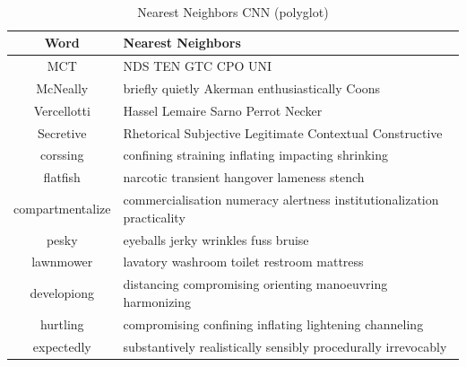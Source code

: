         \begin{table}[!ht]
          \begin{center}
            \caption{Nearest Neighbors CNN (polyglot)}
            ~\\
            \label{tab:nearest:cnn-polyglot}
            \begin{tabular}{c|l}
              \textbf{Word} & \textbf{Nearest Neighbors}\\
              \hline
              MCT & NDS TEN GTC CPO UNI\\
              McNeally & briefly quietly Akerman enthusiastically Coons\\
              Vercellotti & Hassel Lemaire Sarno Perrot Necker\\
              Secretive & Rhetorical Subjective Legitimate Contextual Constructive\\
              corssing & confining straining inflating impacting shrinking\\
              flatfish & narcotic transient hangover lameness stench\\
              compartmentalize & commercialisation numeracy alertness institutionalization practicality\\
              pesky & eyeballs jerky wrinkles fuss bruise\\
              lawnmower & lavatory washroom toilet restroom mattress\\
              developiong & distancing compromising orienting manoeuvring harmonizing\\
              hurtling & compromising confining inflating lightening channeling\\
              expectedly & substantively realistically sensibly procedurally irrevocably\\
            \end{tabular}
          \end{center}
        \end{table}



